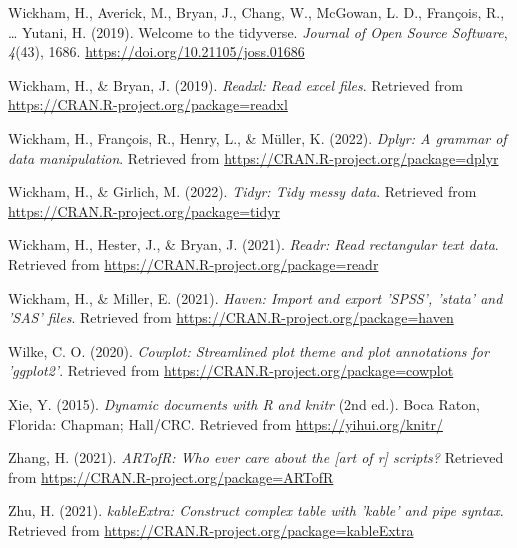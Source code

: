 \documentclass[
  man]{apa6}
\newlength{\cslhangindent}
\newlength{\cslentryspacingunit} %
\newenvironment{CSLReferences}[2] %
 {%
  \setlength{\parindent}{0pt}
  \ifodd #1
  \let\oldpar\par
  \def\par{\hangindent=\cslhangindent\oldpar}
  \fi
  \setlength{\parskip}{#2\cslentryspacingunit}
 }%
 {}
\begin{document}
\begin{CSLReferences}{1}{0}
\leavevmode{}%
Wickham, H., Averick, M., Bryan, J., Chang, W., McGowan, L. D., François, R., \ldots{} Yutani, H. (2019). Welcome to the {tidyverse}. \emph{Journal of Open Source Software}, \emph{4}(43), 1686. \url{https://doi.org/10.21105/joss.01686}

\leavevmode{}%
Wickham, H., \& Bryan, J. (2019). \emph{Readxl: Read excel files}. Retrieved from \url{https://CRAN.R-project.org/package=readxl}

\leavevmode{}%
Wickham, H., François, R., Henry, L., \& Müller, K. (2022). \emph{Dplyr: A grammar of data manipulation}. Retrieved from \url{https://CRAN.R-project.org/package=dplyr}

\leavevmode{}%
Wickham, H., \& Girlich, M. (2022). \emph{Tidyr: Tidy messy data}. Retrieved from \url{https://CRAN.R-project.org/package=tidyr}

\leavevmode{}%
Wickham, H., Hester, J., \& Bryan, J. (2021). \emph{Readr: Read rectangular text data}. Retrieved from \url{https://CRAN.R-project.org/package=readr}

\leavevmode{}%
Wickham, H., \& Miller, E. (2021). \emph{Haven: Import and export 'SPSS', 'stata' and 'SAS' files}. Retrieved from \url{https://CRAN.R-project.org/package=haven}

\leavevmode{}%
Wilke, C. O. (2020). \emph{Cowplot: Streamlined plot theme and plot annotations for 'ggplot2'}. Retrieved from \url{https://CRAN.R-project.org/package=cowplot}

\leavevmode{}%
Xie, Y. (2015). \emph{Dynamic documents with {R} and knitr} (2nd ed.). Boca Raton, Florida: Chapman; Hall/CRC. Retrieved from \url{https://yihui.org/knitr/}

\leavevmode{}%
Zhang, H. (2021). \emph{ARTofR: Who ever care about the {[}art of r{]} scripts?} Retrieved from \url{https://CRAN.R-project.org/package=ARTofR}

\leavevmode{}%
Zhu, H. (2021). \emph{kableExtra: Construct complex table with 'kable' and pipe syntax}. Retrieved from \url{https://CRAN.R-project.org/package=kableExtra}

\end{CSLReferences}

\endgroup


\clearpage
\renewcommand{\listtablename}{Table captions}
\end{document}

